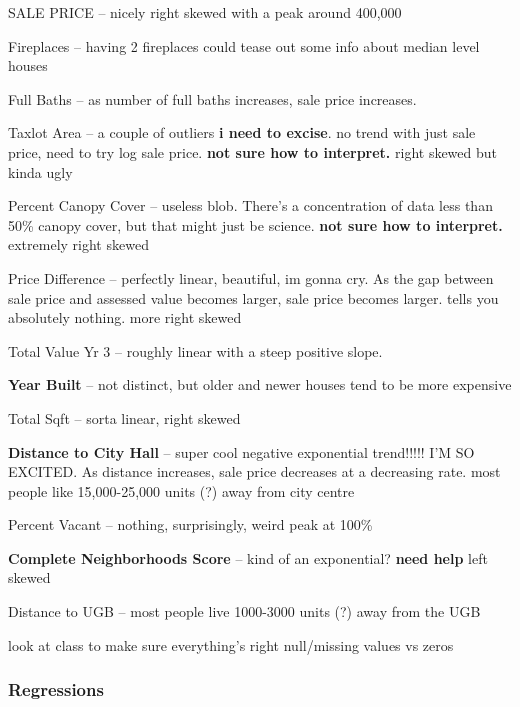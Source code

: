 \documentclass[]{article}
\begin{document}
SALE PRICE -- nicely right skewed with a peak around 400,000

Fireplaces -- having 2 fireplaces could tease out some info about median
level houses

Full Baths -- as number of full baths increases, sale price increases.

Taxlot Area -- a couple of outliers \textbf{i need to excise}. no trend
with just sale price, need to try log sale price. \textbf{not sure how
to interpret. } right skewed but kinda ugly

Percent Canopy Cover -- useless blob. There's a concentration of data
less than 50\% canopy cover, but that might just be science. \textbf{not
sure how to interpret. } extremely right skewed

Price Difference -- perfectly linear, beautiful, im gonna cry. As the
gap between sale price and assessed value becomes larger, sale price
becomes larger. tells you absolutely nothing. more right skewed

Total Value Yr 3 -- roughly linear with a steep positive slope.

\textbf{Year Built} -- not distinct, but older and newer houses tend to
be more expensive

Total Sqft -- sorta linear, right skewed

\textbf{Distance to City Hall} -- super cool negative exponential
trend!!!!! I'M SO EXCITED. As distance increases, sale price decreases
at a decreasing rate. most people like 15,000-25,000 units (?) away from
city centre

Percent Vacant -- nothing, surprisingly, weird peak at 100\%

\textbf{Complete Neighborhoods Score} -- kind of an exponential?
\textbf{need help} left skewed

Distance to UGB -- most people live 1000-3000 units (?) away from the
UGB

look at class to make sure everything's right null/missing values vs
zeros

\hypertarget{regressions}{%
\subsubsection{Regressions}\label{regressions}}
\end{document}
